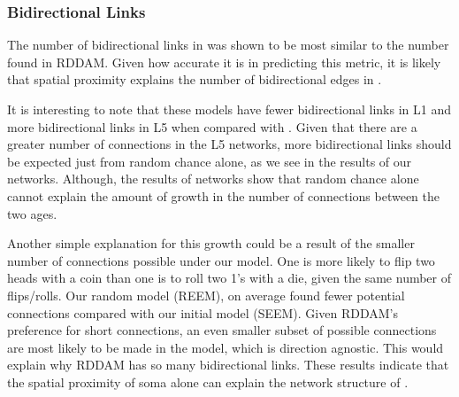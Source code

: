 \subsubsection{Bidirectional Links}
The number of bidirectional links in \ce was shown to be most similar to the number found in RDDAM.
Given how accurate it is in predicting this metric, it is likely that spatial proximity explains the number of bidirectional edges in \ce.

It is interesting to note that these models have fewer bidirectional links in L1 and more bidirectional links in L5 when compared with \ce. 
Given that there are a greater number of connections in the L5 networks, more bidirectional links should be expected just from random chance alone, as we see in the results of our \er networks. 
Although, the results of \er networks show that random chance alone cannot explain the amount of growth in the number of connections between the two ages. 

Another simple explanation for this growth could be a result of the smaller number of connections possible under our model. 
One is more likely to flip two heads with a coin than one is to roll two 1's with a die, given the same number of flips/rolls. 
Our random model (REEM), on average found fewer potential connections compared with our initial model (SEEM). 
Given RDDAM's preference for short connections, an even smaller subset of possible connections are most likely to be made in the model, which is direction agnostic. 
This would explain why RDDAM has so many bidirectional links. 
These results indicate that the spatial proximity of soma alone can explain the network structure of \ce.